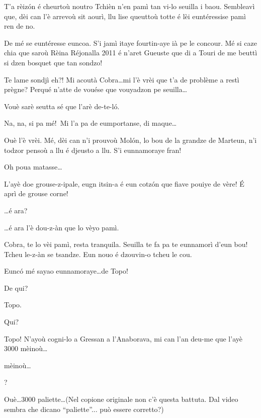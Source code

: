 \begin{drama}
\Tzardounspeaks T’a rèiz\'on é cheurtoù noutro Tchièn n’en pamì tan vi-lo seuilla i baou. Sembleavì que, dèi can l'è arrevoù sit aourì, llu lise queuttoù totte é lèi euntéressise pamì ren de no.

\Cobraspeaks De mé se euntéresse euncoa. S’i jamì itaye fourtin-aye ià pe le concour. Mé si caze chia que saroù Rèina Réjonalla 2011 é n’aret Gueuste que di a Touri de me beuttì si dzen bosquet que tan sondzo!

\Tzardounspeaks Te lame sondjì eh?!  Mi acoutà Cobra\ldots mi l’è vrèi que t’a de problème a restì prègne? Perqué n’atte de vouése que vouyadzon pe seuilla\ldots


\Cobraspeaks Vouè sarè seutta sé que l’arè de-te-l\'o.

\Piccinaspeaks Na, na, si pa mé!\imbarazzatoo\ Mi l’a pa de eumportanse, di maque\ldots

\Cobraspeaks Ouè l’è vrèi. Mé, dèi can n’i prouvoù Mol\'on, lo bou de la grandze de Marteun, n’i todzor pensoù a llu é djeusto a llu. S’i eunnamoraye fran!

\Piccinaspeaks Oh poua matasse\ldots

\Cobraspeaks  L’ayè doe grouse-z-ipale, eugn itsin-a é eun cotz\'on que fiave pouiye de vère! \'E aprì de grouse corne!

\Piccinaspeaks \ldots é ara?

\Cobraspeaks \ldots é ara l’è dou-z-àn que lo vèyo pamì.

\Tzardounspeaks Cobra, te lo vèi pamì, resta tranquila. Seuilla te fa pa te eunnamorì d’eun bou! Tcheu le-z-àn se tsandze. Eun nouo é dzouvin-o tcheu le cou.

\Piccinaspeaks Eunc\'o mé sayao eunnamoraye\ldots de Topo!

\Tzardounspeaks De qui?

\Piccinaspeaks Topo.

\Tzardounspeaks Qui?

\Piccinaspeaks {} Topo! N’ayoù cogni-lo a Gressan a l’Anaborava, mi can l’an deu-me que l’ayè 3000 mèinoù\ldots

 mèinoù\ldots

?

\Piccinaspeaks Ouè\ldots 3000 paliette\ldots (Nel copione originale non c'è questa battuta. Dal video sembra che dicano ``paliette''... può essere corretto?)


\end{drama}
